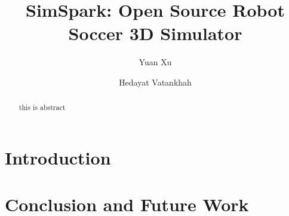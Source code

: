 \documentclass{llncs}
\begin{document}
\title{SimSpark: Open Source Robot Soccer 3D Simulator}

\author{Yuan Xu \and Hedayat Vatankhah}


\maketitle

\begin{abstract}
  this is abstract
\end{abstract}

\section{Introduction}
\cite{Boedecker2008,OR05}

\section{Conclusion and Future Work}



\end{document}
